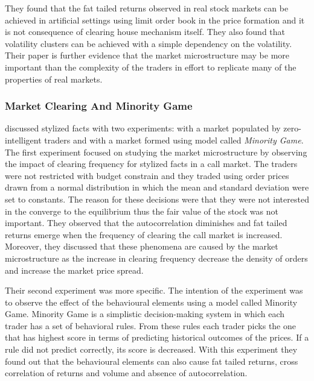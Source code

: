 They found that the fat tailed returns observed in
real stock markets can be achieved in artificial settings using limit 
order book in the price formation and it is not consequence of clearing 
house mechanism itself. They also found that volatility clusters can
be achieved with a simple dependency on the volatility. Their paper
is further evidence that the market microstructure may be more
important than the complexity of the traders in effort to replicate
many of the properties of real markets.

\subsubsection{Market Clearing And Minority Game}

\citet{LIU20082535} discussed stylized facts with two experiments: with
a market populated by zero-intelligent traders and with a market formed using 
model called \textit{Minority Game}. The first experiment focused on studying
the market microstructure by observing the impact of clearing frequency for 
stylized facts in a call market. The traders were not restricted with budget 
constrain and they traded using order prices drawn from a normal distribution 
in which the mean and standard deviation were set to constants. The reason 
for these decisions were that they were not interested in the converge to 
the equilibrium thus the fair value of the stock was not important. They 
observed that the autocorrelation diminishes and fat tailed returns emerge 
when the frequency of clearing the call market is increased. Moreover,
they discussed that these phenomena are caused by the market microstructure
as the increase in clearing frequency decrease the density of orders and 
increase the market price spread.

Their second experiment was more specific. The intention of the experiment 
was to observe the effect of the behavioural elements using a model called
Minority Game. Minority Game is a simplistic decision-making system in
which each trader has a set of behavioral rules. From these rules each
trader picks the one that has highest score in terms of predicting 
historical outcomes of the prices. If a rule did not predict correctly,
its score is decreased. With this experiment they found out that the
behavioural elements can also cause fat tailed returns, cross correlation 
of returns and volume and absence of autocorrelation.
